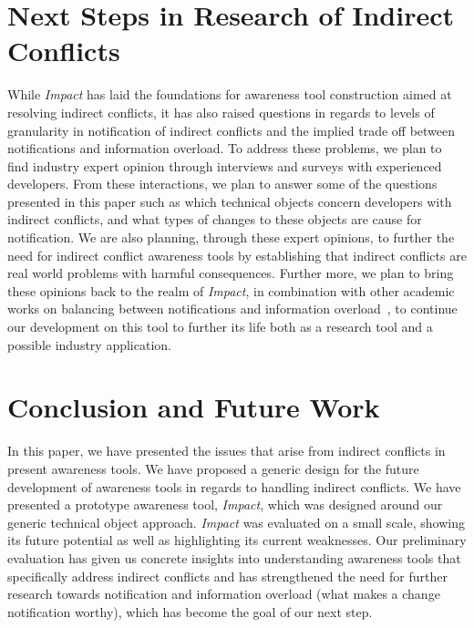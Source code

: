 \documentclass[conference]{IEEEtran}
\begin{document}
\section{Next Steps in Research of Indirect Conflicts}
While \textit{Impact} has laid the foundations for awareness tool construction
aimed at resolving indirect conflicts, it has also raised questions 
in regards to levels of granularity in notification of indirect conflicts and the
implied trade off between notifications and information overload. To address
these problems, we plan to find industry expert opinion through interviews
and surveys with experienced developers. From these interactions, we plan to
answer some of the questions presented in this paper such as which technical
objects concern developers with indirect conflicts, and what types of changes
to these objects are cause for notification. We are also planning, through these
expert opinions, to further the 
need for indirect conflict awareness tools by establishing that indirect
conflicts are real world problems with harmful consequences. 
Further more, we plan to bring these opinions back to the realm of 
\textit{Impact}, in combination with other academic works on balancing
between notifications and information overload~\cite{Wang:2007}, to
continue our development
on this tool to further its life both as a research tool and a possible
industry application. 

\section{Conclusion and Future Work}
In this paper, we have presented the issues that arise from indirect 
conflicts in present awareness tools. We have proposed a generic 
design for the future development of awareness tools in regards to
handling indirect conflicts. We have presented a prototype 
awareness tool, \textit{Impact}, which was designed around our generic 
technical object approach. \textit{Impact} was evaluated on a small scale, showing
its future potential as well as highlighting its current weaknesses. 
Our preliminary evaluation has given us concrete insights into 
understanding awareness tools that specifically address indirect conflicts and has
strengthened the need for further research towards notification and information
overload (what makes a change notification
worthy), which has become the goal of our next step.





\end{document}
